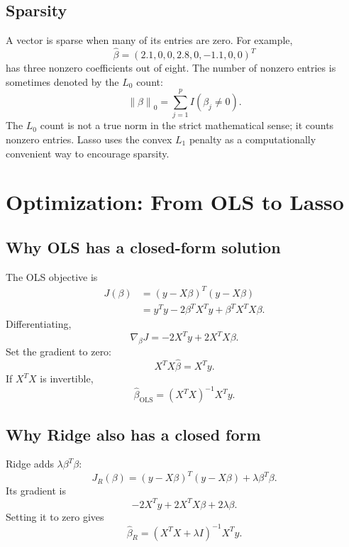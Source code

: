 \documentclass[11pt,a4paper]{article}
\numberwithin{equation}{section}
\newcommand{\norm}[1]{\left\lVert #1\right\rVert}
\begin{document}
\subsection{Sparsity}
A vector is sparse when many of its entries are zero. For example,
\begin{equation}
  \hat\beta=(2.1,0,0,2.8,0,-1.1,0,0)^T
\end{equation}
has three nonzero coefficients out of eight. The number of nonzero entries is sometimes denoted by the $L_0$ count:
\begin{equation}
  \norm{\beta}_0=\sum_{j=1}^p I(\beta_j\neq0).
\end{equation}
The $L_0$ count is not a true norm in the strict mathematical sense; it counts nonzero entries. Lasso uses the convex $L_1$ penalty as a computationally convenient way to encourage sparsity.

\section{Optimization: From OLS to Lasso}
\subsection{Why OLS has a closed-form solution}
The OLS objective is
\begin{align}
  J(\beta)&=(y-X\beta)^T(y-X\beta)\\
  &=y^Ty-2\beta^TX^Ty+\beta^TX^TX\beta.
\end{align}
Differentiating,
\begin{equation}
  \nabla_\beta J=-2X^Ty+2X^TX\beta.
\end{equation}
Set the gradient to zero:
\begin{equation}
  X^TX\hat\beta=X^Ty.
\end{equation}
If $X^TX$ is invertible,
\begin{equation}
  \boxed{\hat\beta_{\mathrm{OLS}}=(X^TX)^{-1}X^Ty.}
\end{equation}

\subsection{Why Ridge also has a closed form}
Ridge adds $\lambda\beta^T\beta$:
\begin{equation}
  J_R(\beta)=(y-X\beta)^T(y-X\beta)+\lambda\beta^T\beta.
\end{equation}
Its gradient is
\begin{equation}
  -2X^Ty+2X^TX\beta+2\lambda\beta.
\end{equation}
Setting it to zero gives
\begin{equation}
  \boxed{\hat\beta_R=(X^TX+\lambda I)^{-1}X^Ty.}
\end{equation}
\end{document}
